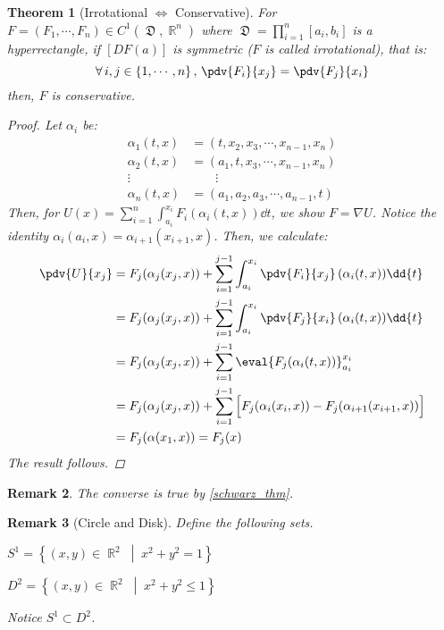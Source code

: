 \documentclass[12pt]{article}
\let\LR\Leftrightarrow
\renewcommand{\grad}{\nabla}
\newcommand{\set}[2]{\left\{{#1}\;\middle|\;{#2}\right\}}
\newcommand{\Forall}[1]{\forall\,{#1}\,,\,}
\DeclareMathOperator{\R}{\mathbb{R}}
\DeclareMathOperator{\D}{\mathfrak{D}}
\newtheorem{theorem}{Theorem}[subsection]
\newtheorem{remark}[theorem]{Remark}
\begin{document}
\begin{theorem}[Irrotational $\LR$ Conservative]
  For $F=(F_1,\cdots,F_n)\in C^1(\D,\R^n)$ where $\D=\prod_{i=1}^n[a_i,b_i]$ is a hyperrectangle, if $[DF(a)]$ is symmetric ($F$ is called irrotational), that is: $$\Forall{i,j\in\{1,\cdots,n\}}\pdv{F_i}{x_j}=\pdv{F_j}{x_i}$$ then, $F$ is conservative.
  \begin{proof}
    Let $\alpha_i$ be:
    \begin{align*}
      \alpha_1(t,x)&=(t,x_2,x_3,\cdots,x_{n-1},x_n)\\
      \alpha_2(t,x)&=(a_1,t,x_3,\cdots,x_{n-1},x_n)\\
      \vdots\quad&\qquad\vdots\\
      \alpha_n(t,x)&=(a_1,a_2,a_3,\cdots,a_{n-1},t)
    \end{align*}
    Then, for $U(x)=\displaystyle\sum_{i=1}^n\int_{a_i}^{x_i}F_i(\alpha_i(t,x))\dd{t}$, we show $F=\grad U$. Notice the identity $\alpha_i(a_i,x)=\alpha_{i+1}(x_{i+1},x)$. Then, we calculate:
    \begin{align*}
      \pdv{U}{x_j}&=F_j(\alpha_j(x_j,x))+\sum_{i=1}^{j-1}\int_{a_i}^{x_i}\pdv{F_i}{x_j}\,(\alpha_i(t,x))\dd{t}\\
      &=F_j(\alpha_j(x_j,x))+\sum_{i=1}^{j-1}\int_{a_i}^{x_i}\pdv{F_j}{x_i}\,(\alpha_i(t,x))\dd{t}\\
      &=F_j(\alpha_j(x_j,x))+\sum_{i=1}^{j-1}\eval{F_j(\alpha_i(t,x))}_{a_i}^{x_i}\\
      &=F_j(\alpha_j(x_j,x))+\sum_{i=1}^{j-1}\Big[F_j(\alpha_i(x_i,x))-F_j(\alpha_{i+1}(x_{i+1},x))\Big]\\
      &=F_j(\alpha(x_1,x))=F_j(x)
    \end{align*}
    The result follows.
  \end{proof}
\end{theorem}

\begin{remark}
  The converse is true by \ref{schwarz_thm}.
\end{remark}

\begin{remark}[Circle and Disk]
  Define the following sets.
  \begin{compactitem}
    \item $S^1=\set{(x,y)\in\R^2}{x^2+y^2=1}$
    \item $D^2=\set{(x,y)\in\R^2}{x^2+y^2\leq 1}$
  \end{compactitem}
  Notice $S^1\subset D^2$.
\end{remark}
\end{document}
